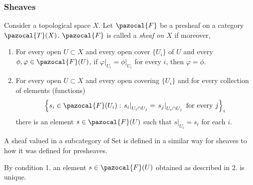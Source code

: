 \subsubsection{Sheaves}
\begin{definition}
    Consider a topological space $X$. Let $\pazocal{F}$ be a presheaf on a category $\pazocal{T}(X)$. $\pazocal{F}$ is called a \emph{sheaf on $X$} if moreover, 
    \begin{enumerate}
        \item For every open $U\subset X$ and every open cover $\{U_i\}$ of $U$ and every $\phi,\varphi\in \pazocal{F}(U)$, if $\left.\varphi\right|_{U_i}= \left.\phi\right|_{U_i}$ for every $i$, then $\varphi=\phi$.
        \item For every open $U\subset X$ and every open covering $\{U_i\}$ and for every collection of elements (functions) 
        $$\left\{s_i\in \pazocal{F}(U_i): \left.s_i\right|_{U_i\cap U_j}=\left. s_j\right|_{U_i\cap U_j} \text{ for every }j\right\}_{i}$$
        there is an element $s\in \pazocal{F}(U)$ such that $\left.s\right|_{U_i}=s_i$ for each $i$.   
    \end{enumerate}
    A sheaf valued in a subcategory of $\mathrm{Set}$ is defined in a similar way for sheaves to how it was defined for presheaves. 
\end{definition}
\begin{remark}
    By condition 1. an element $s\in \pazocal{F}(U)$ obtained as described in 2. is unique.
\end{remark}

